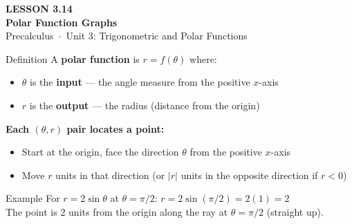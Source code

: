 \documentclass[aspectratio=169, 11pt]{beamer}
\begin{document}
{
\begin{frame}[plain]
  \vspace{2.8cm}\hspace{0.55cm}%
  \begin{minipage}{0.9\textwidth}
    {\color{goldacc}\bfseries\small LESSON 3.14}\\[0.5cm]
    {\color{white}\bfseries\LARGE Polar Function Graphs}\\[1.2cm]
    {\color{skymid}\small Precalculus~$\cdot$~Unit 3: Trigonometric and Polar Functions}
  \end{minipage}
\end{frame}
}

\begin{frame}[t, plain]

  \begin{block}{Definition}
    A \textbf{polar function} is $r = f(\theta)$ where:
    \begin{itemize}
      \item $\theta$ is the \textbf{input} --- the angle measure from the positive $x$-axis
      \item $r$ is the \textbf{output} --- the radius (distance from the origin)
    \end{itemize}
  \end{block}

  \vspace{0.4cm}
  \textbf{Each $(\theta, r)$ pair locates a point:}
  \begin{itemize}
    \item Start at the origin, face the direction $\theta$ from the positive $x$-axis
    \item Move $r$ units in that direction (or $|r|$ units in the opposite direction if $r < 0$)
  \end{itemize}

  \vspace{0.4cm}
  \begin{block}{Example}
    For $r = 2\sin\theta$ at $\theta = \pi/2$: \quad $r = 2\sin(\pi/2) = 2(1) = 2$\\
    The point is 2 units from the origin along the ray at $\theta = \pi/2$ (straight up).
  \end{block}
\end{frame}
\end{document}
